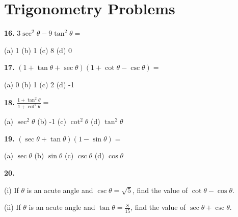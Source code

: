 \documentclass{article}
\begin{document}
	
	\section*{Trigonometry Problems}
	
	
	
	\textbf{16.} $3\sec^2 \theta - 9\tan^2 \theta =$
	
	(a) 1 \qquad (b) 1 \qquad (c) 8 \qquad (d) 0
	
	\vspace{0.3cm}
	
	\textbf{17.} $(1 + \tan \theta + \sec \theta)(1 + \cot \theta - \csc \theta) =$
	
	(a) 0 \qquad (b) 1 \qquad (c) 2 \qquad (d) -1
	
	\vspace{0.3cm}
	
	\textbf{18.} $\frac{1 + \tan^2 \theta}{1 + \cot^2 \theta} =$
	
	(a) $\sec^2 \theta$ \qquad (b) -1 \qquad (c) $\cot^2 \theta$ \qquad (d) $\tan^2 \theta$
	
	\vspace{0.3cm}
	
	\textbf{19.} $(\sec \theta + \tan \theta)(1 - \sin \theta) =$
	
	(a) $\sec \theta$ \qquad (b) $\sin \theta$ \qquad (c) $\csc \theta$ \qquad (d) $\cos \theta$
	
	\vspace{1cm} %
	
	
	\textbf{20.}
	
	(i) If $\theta$ is an acute angle and $\csc \theta = \sqrt{5}$, find the value of $\cot \theta - \cos \theta$.
	
	\vspace{0.5cm}
	
	(ii) If $\theta$ is an acute angle and $\tan \theta = \frac{8}{15}$, find the value of $\sec \theta + \csc \theta$.
	
	\vspace{1cm}
	
	
\end{document}

